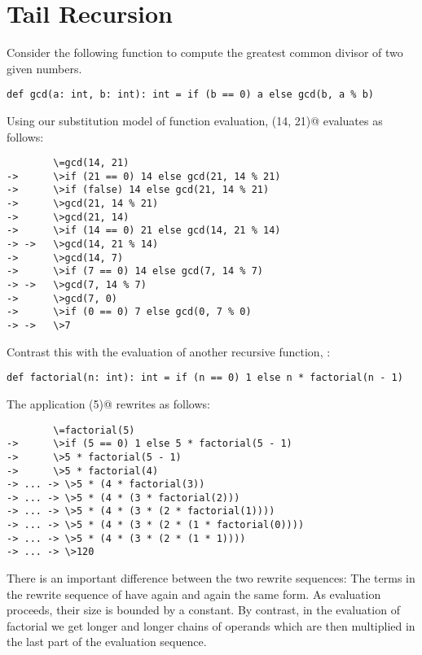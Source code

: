 \documentclass[11pt]{book}
\begin{document}
\section{Tail Recursion}

Consider the following function to compute the greatest common divisor
of two given numbers.

\begin{verbatim}
def gcd(a: int, b: int): int = if (b == 0) a else gcd(b, a % b)
\end{verbatim}

Using our substitution model of function evaluation, 
\verb@gcd(14, 21)@ evaluates as follows:

\begin{verbatim}
        \=gcd(14, 21)  
->      \>if (21 == 0) 14 else gcd(21, 14 % 21)
->      \>if (false) 14 else gcd(21, 14 % 21)
->      \>gcd(21, 14 % 21)
->      \>gcd(21, 14)
->      \>if (14 == 0) 21 else gcd(14, 21 % 14)
-> ->   \>gcd(14, 21 % 14)
->      \>gcd(14, 7)
->      \>if (7 == 0) 14 else gcd(7, 14 % 7)
-> ->   \>gcd(7, 14 % 7)
->      \>gcd(7, 0)
->      \>if (0 == 0) 7 else gcd(0, 7 % 0)
-> ->   \>7
\end{verbatim}

Contrast this with the evaluation of another recursive function, 
\verb@factorial@:

\begin{verbatim}
def factorial(n: int): int = if (n == 0) 1 else n * factorial(n - 1)
\end{verbatim}

The application \verb@factorial(5)@ rewrites as follows:
\begin{verbatim}
        \=factorial(5)
->      \>if (5 == 0) 1 else 5 * factorial(5 - 1)
->      \>5 * factorial(5 - 1)
->      \>5 * factorial(4)
-> ... -> \>5 * (4 * factorial(3))
-> ... -> \>5 * (4 * (3 * factorial(2)))
-> ... -> \>5 * (4 * (3 * (2 * factorial(1))))
-> ... -> \>5 * (4 * (3 * (2 * (1 * factorial(0))))
-> ... -> \>5 * (4 * (3 * (2 * (1 * 1))))
-> ... -> \>120

\end{verbatim}
There is an important difference between the two rewrite sequences:
The terms in the rewrite sequence of \verb@gcd@ have again and again
the same form. As evaluation proceeds, their size is bounded by a
constant. By contrast, in the evaluation of factorial we get longer
and longer chains of operands which are then multiplied in the last
part of the evaluation sequence.
\end{document}
